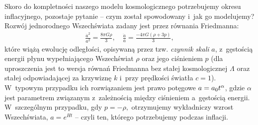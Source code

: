 \begin{dwieszpalty}
Skoro do kompletności naszego modelu kosmologicznego potrzebujemy okresu inflacyjnego, pozostaje pytanie -- czym został spowodowany i~jak go modelujemy? Rozwój jednorodnego Wszechświata zadany jest przez równania Friedmanna:
\begin{align*}
    \frac{\dot{a}^2}{a^2} = \frac{8\pi G \rho}{3},
\quad
     \frac{\ddot{a}}{a} = \frac{-4 \pi G(\rho + 3p)}{3},
\end{align*}
które wiążą ewolucję odległości, opisywaną przez tzw. \textit{czynnik skali} $a$, z~gęstością energii płynu wypełniającego Wszechświat $\rho$ oraz jego ciśnieniem $p$ (dla uproszczenia jest to wersja równań Friedmanna bez stałej kosmologicznej $\Lambda$ oraz stałej odpowiadającej za krzywiznę $k$ i~przy prędkości światła $c=1$). W~typowym przypadku ich rozwiązaniem jest prawo potęgowe $a =\nobreak a_0 t^\alpha$, gdzie $\alpha$ jest parametrem związanym z~zależnością między ciśnieniem a~gęstością energii. W~szczególnym przypadku, gdy $p = -\rho,$ otrzymujemy wykładniczy wzrost Wszechświata, $a = e^{H t}$ -- czyli ten, którego potrzebujemy podczas inflacji.
\end{dwieszpalty}

